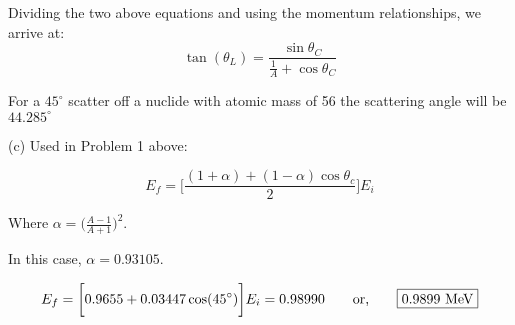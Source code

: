 \documentclass{amsart}
\theoremstyle{definition}
\begin{document}
Dividing the two above equations and using the momentum relationships, we arrive at:
$$ \tan(\theta_L) = \frac{\sin \theta_C}{\frac{1}{A} + \cos \theta_C} $$


For a $45^\circ$ scatter off a nuclide with atomic mass of 56 the scattering angle will be $\boxed{44.285^\circ}$




(c)
Used in Problem 1 above:

$$ E_f = \bigg[ \frac{(1+\alpha)+(1-\alpha) \cos \theta_c}{2} \bigg] E_i $$


Where $\alpha = \big( \frac{A-1}{A+1} \big)^2$.

In this case, $\alpha = 0.93105$.

$$ E_f = \bigg[ 0.9655 + 0.03447\cos(45^\circ) \bigg] E_i = 0.98990 \qquad \textnormal{or,} \qquad \boxed{0.9899 \textnormal{ MeV}} $$
\end{document}
